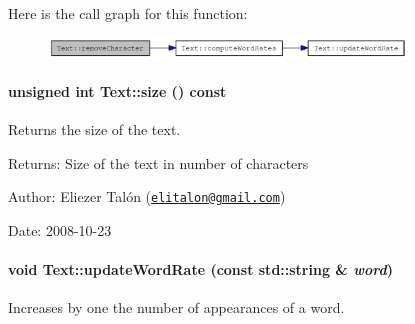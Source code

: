 Here is the call graph for this function:\nopagebreak
\begin{figure}[H]
\begin{center}
\leavevmode
\includegraphics[width=269pt]{class_text_e04500eeada2a4a3bb00554b32263c52_cgraph}
\end{center}
\end{figure}
\hypertarget{class_text_b66729ba84c2698ed888f641b3838a8b}{
\paragraph[{size}]{\setlength{\rightskip}{0pt plus 5cm}unsigned int Text::size () const}\hfill}
\label{class_text_b66729ba84c2698ed888f641b3838a8b}


Returns the size of the text. 

\begin{Desc}
\item[Returns:]Size of the text in number of characters\end{Desc}
\begin{Desc}
\item[Author:]Eliezer Talón (\href{mailto:elitalon@gmail.com}{\tt elitalon@gmail.com}) \end{Desc}
\begin{Desc}
\item[Date:]2008-10-23 \end{Desc}
\hypertarget{class_text_5ab8f9bfa566de537a167991fe10eff5}{
\paragraph[{updateWordRate}]{\setlength{\rightskip}{0pt plus 5cm}void Text::updateWordRate (const std::string \& {\em word})}\hfill}
\label{class_text_5ab8f9bfa566de537a167991fe10eff5}


Increases by one the number of appearances of a word. 

